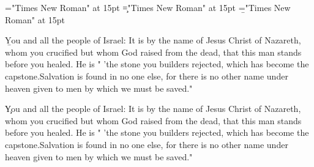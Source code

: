 \documentclass[a4paper]{article}
\begin{document}
 
\pagestyle{plain} 
\font\a="Times New Roman" at 15pt
\font\c="Times New Roman" at 15pt
\font\b="Times New Roman" at 15pt
\pagestyle{fancy} 

\b{You and all the people of Israel: It is by the name of Jesus Christ of Nazareth, whom you crucified but whom God raised from the dead, that this man stands before you healed. He is " 'the stone you builders rejected, which has become the capstone.Salvation is found in no one else, for there is no other name under heaven given to men by which we must be saved." }

\c{You and all the people of Israel: It is by the name of Jesus Christ of Nazareth, whom you crucified but whom God raised from the dead, that this man stands before you healed. He is " 'the stone you builders rejected, which has become the capstone.Salvation is found in no one else, for there is no other name under heaven given to men by which we must be saved." }

\end{document}
